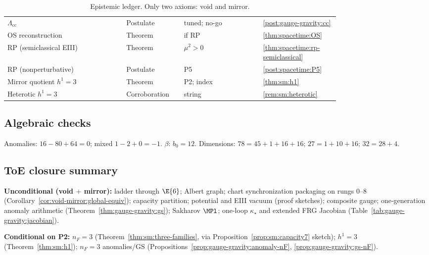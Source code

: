 \begin{table}[ht]
\begin{tabular}{@{}p{0.30\linewidth}p{0.12\linewidth}p{0.20\linewidth}p{0.16\linewidth}@{}}
$\Lambda_{\mathrm{cc}}$ & Postulate & tuned; no-go & \ref{post:gauge-gravity:cc} \\
OS reconstruction & Theorem & if RP & \ref{thm:spacetime:OS} \\
RP (semiclassical EIII) & Theorem & $\mu^2>0$ & \ref{thm:spacetime:rp-semiclassical} \\
RP (nonperturbative) & Postulate & P5 & \ref{post:spacetime:P5} \\
Mirror quotient $h^1=3$ & Theorem & P2; index & \ref{thm:sm:h1} \\
Heterotic $h^1=3$ & Corroboration & string & \ref{rem:sm:heterotic} \\
\bottomrule
\end{tabular}
\caption{Epistemic ledger. Only two axioms: void and mirror.}
\label{tab:verification:ledger}
\end{table}

\subsection{Algebraic checks}
\label{sec:verification:algebra}

Anomalies: $16-80+64=0$; mixed $1-2+0=-1$. $\beta$: $b_0=12$.
Dimensions: $78=45+1+16+16$; $27=1+10+16$; $32=28+4$.

\subsection{ToE closure summary}
\label{sec:verification:toe}

\textbf{Unconditional (void $+$ mirror):} ladder through $\E{6}$; Albert
graph; chart synchronization packaging on rungs $0$--$8$
(Corollary~\ref{cor:void-mirror:global-equiv}); capacity partition;
potential and EIII vacuum (proof sketches); composite gauge; one-generation
anomaly arithmetic (Theorem~\ref{thm:gauge-gravity:gs}); Sakharov $\MPl$;
one-loop $\kappa_\star$ and extended FRG Jacobian
(Table~\ref{tab:gauge-gravity:jacobian}).

\textbf{Conditional on P2:} $n_F=3$ (Theorem~\ref{thm:sm:three-families}, via
Proposition~\ref{prop:sm:capacity7} sketch); $h^1=3$
(Theorem~\ref{thm:sm:h1}); $n_F=3$ anomalies/GS
(Propositions~\ref{prop:gauge-gravity:anomaly-nF}, \ref{prop:gauge-gravity:gs-nF}).


